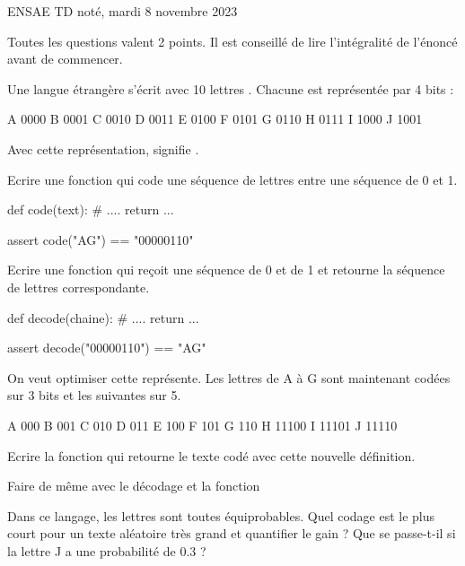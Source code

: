 %

\huge ENSAE TD noté, mardi 8 novembre 2023 \normalsize

Toutes les questions valent 2 points. Il est conseillé de lire l'intégralité de l'énoncé avant de commencer.

\exosubject{}
\begin{xexercice}\label{td_note_label4_2023}

Une langue étrangère s'écrit avec 10 lettres . Chacune est représentée par 4 bits :

\begin{verbatimx}
A 0000
B 0001
C 0010
D 0011
E 0100
F 0101
G 0110
H 0111
I 1000
J 1001
\end{verbatimx}

Avec cette représentation,  signifie .

\exequest Ecrire une fonction qui code une séquence de lettres entre une séquence de 0 et 1.

\begin{verbatimx}
def code(text):
    # ....
    return ...

assert code("AG") == "00000110"
\end{verbatimx}

\exequest Ecrire une fonction qui reçoit une séquence de 0 et de 1 et retourne la séquence de lettres correspondante.

\begin{verbatimx}
def decode(chaine):
    # ....
    return ...

assert decode("00000110") == "AG"
\end{verbatimx}

\exequest On veut optimiser cette représente. Les lettres de A à G sont maintenant codées sur 3 bits et les suivantes sur 5.

\begin{verbatimx}
A 000
B 001
C 010
D 011
E 100
F 101
G 110
H 11100
I 11101
J 11110
\end{verbatimx}
 
Ecrire la fonction  qui retourne le texte codé avec cette nouvelle définition.

\exequest Faire de même avec le décodage et la fonction 

\exequest Dans ce langage, les lettres sont toutes équiprobables.
Quel codage est le plus court pour un texte aléatoire très grand et quantifier le gain ?
Que se passe-t-il si la lettre J a une probabilité de 0.3 ?


\end{xexercice}
